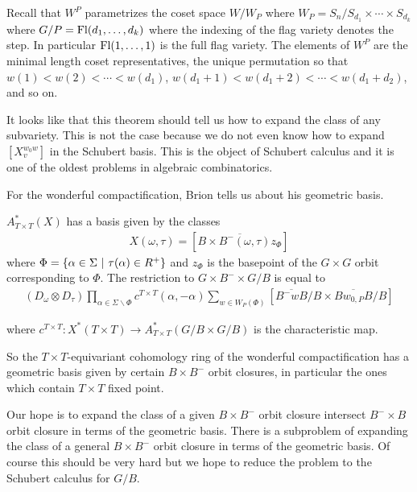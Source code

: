 \documentclass[12pt]{article}
\begin{document}
Recall that $W^P$ parametrizes the coset space $W/W_P$ where $W_P = S_n/S_{d_1}\times \cdots \times S_{d_k}$
where $G/P = \operatorname{Fl}(d_1,\dots,d_k)$ where the indexing of the flag variety denotes the step. In particular
$\operatorname{Fl}(1,\dots,1)$ is the full flag variety. The elements of $W^P$ are the minimal length coset representatives,
the unique permutation so that $w(1)<w(2)<\cdots<w(d_1)$, $w(d_1+1)<w(d_1+2)<\cdots<w(d_1+d_2)$, and so on.

\hfill

It looks like that this theorem should tell us how to expand the class of any subvariety.
This is not the case because we do not even know how to expand $[X_v^{w_0w}]$ in the Schubert basis.
This is the object of Schubert calculus and it is one of the oldest problems in algebraic combinatorics.

\hfill

For the wonderful compactification, Brion tells us about his geometric basis.

\begin{theorem}
    $A_{T\times T}^*(X)$ has a basis given by the classes \begin{align*}
        X(\omega,\tau) = [\overline{B\times B^-(\omega,\tau)z_\Phi}]
    \end{align*} where $\Phi = \{\alpha\in\Sigma \ \vert \  \tau(\alpha)\in R^+\}$ and $z_\Phi$ is the basepoint of the $G\times G$ orbit corresponding
    to $\Phi$. The restriction to $G\times B^-\times G/B$ is equal to \begin{align*}
        (D_\omega \otimes D_\tau) \prod_{\alpha\in\Sigma\backslash\Phi}c^{T\times T}(\alpha,-\alpha)\sum_{w\in W_P(\Phi)}[\overline{B^-wB}/B\times \overline{Bw_{0,P}B}/B]
    \end{align*}
\end{theorem}
where $c^{T\times T}:X^*(T\times T)\to A_{T\times T}^*(G/B\times G/B)$ is the characteristic map.

So the $T\times T$-equivariant cohomology ring of the wonderful compactification
has a geometric basis given by certain $B\times B^-$ orbit closures, in particular the ones which
contain $T\times T$ fixed point.

\hfill

Our hope is to expand the class of a given $B\times B^-$ orbit closure intersect $B^-\times B$ orbit closure
in terms of the geometric basis. There is a subproblem of expanding the class of a 
general $B\times B^-$ orbit closure in terms of the geometric basis. Of course this should be very hard
but we hope to reduce the problem to the Schubert calculus for $G/B$.
\end{document}
